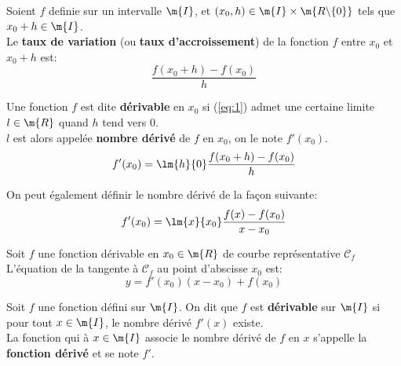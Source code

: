 \def\theme{Nombre dérivé. Fonction dérivée.}
\def\date{09/10/2023}


Soient $f$ definie sur un intervalle $\m {I}$,
et $(x_0,h)\in\m{I}\times\m{R\backslash\{0\}}$
tels que $x_0+h\in\m{I}$.\\
Le \textbf{taux de variation} (ou \textbf{taux d'accroissement}) de la fonction $f$ entre $x_0$ et $x_0+h$ est:
\begin{equation}\label{eq:1}
    \frac{f(x_0+h)-f(x_0)}{h}
\end{equation}

Une fonction $f$ est dite \textbf{dérivable} en $x_0$ si (\ref{eq:1})
admet une certaine limite $l\in\m{R}$ quand $h$ tend vers $0$.\\
$l$ est alors appelée \textbf{nombre dérivé} de $f$ en $x_0$, on le note $f'(x_0)$.\\
\begin{equation*}
    f'(x_0) = \lm{h}{0}\frac{f(x_0+h)-f(x_0)}{h}
\end{equation*}

\rmq{}
On peut également définir le nombre dérivé de la façon suivante:
\begin{equation*}
    f'(x_0) = \lm{x}{x_0}\frac{f(x)-f(x_0)}{x-x_0}
\end{equation*}

\pr{}
Soit $f$ une fonction dérivable en $x_0\in\m{R}$ de courbe représentative $\mathscr{C}_f$\\
L'équation de la tangente à $\mathscr{C}_f$ au point d'abscisse $x_0$ est:
\begin{equation*}
    y = f'(x_0)(x-x_0) + f(x_0)
\end{equation*}

Soit $f$ une fonction défini sur $\m{I}$. On dit que $f$ est \textbf{dérivable} sur $\m{I}$ si pour tout $x\in\m{I}$,
le nombre dérivé $f'(x)$ existe.\\
La fonction qui à $x\in\m{I}$ associe le nombre dérivé de $f$ en $x$ s'appelle la \textbf{fonction dérivé} et se note $f'$.

\newpage


